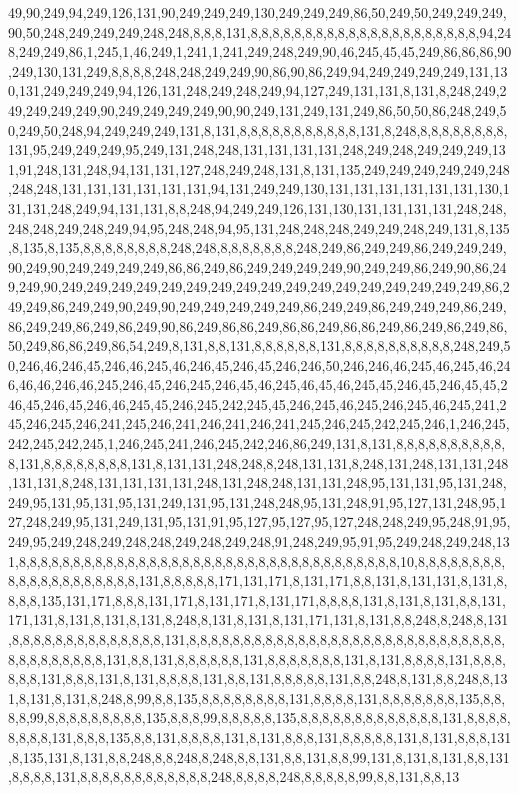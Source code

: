 49,90,249,94,249,126,131,90,249,249,249,130,249,249,249,86,50,249,50,249,249,249,90,50,248,249,249,249,248,248,8,8,8,131,8,8,8,8,8,8,8,8,8,8,8,8,8,8,8,8,8,8,8,8,8,94,248,249,249,86,1,245,1,46,249,1,241,1,241,249,248,249,90,46,245,45,45,249,86,86,86,90,249,130,131,249,8,8,8,8,248,248,249,249,90,86,90,86,249,94,249,249,249,249,131,130,131,249,249,249,94,126,131,248,249,248,249,94,127,249,131,131,8,131,8,248,249,249,249,249,249,90,249,249,249,249,90,90,249,131,249,131,249,86,50,50,86,248,249,50,249,50,248,94,249,249,249,131,8,131,8,8,8,8,8,8,8,8,8,8,8,131,8,248,8,8,8,8,8,8,8,8,131,95,249,249,249,95,249,131,248,248,131,131,131,131,248,249,248,249,249,249,131,91,248,131,248,94,131,131,127,248,249,248,131,8,131,135,249,249,249,249,249,248,248,248,131,131,131,131,131,131,94,131,249,249,130,131,131,131,131,131,131,130,131,131,248,249,94,131,131,8,8,248,94,249,249,126,131,130,131,131,131,131,248,248,248,248,249,248,249,94,95,248,248,94,95,131,248,248,248,249,249,248,249,131,8,135,8,135,8,135,8,8,8,8,8,8,8,8,248,248,8,8,8,8,8,8,8,248,249,86,249,249,86,249,249,249,90,249,90,249,249,249,249,86,86,249,86,249,249,249,249,90,249,249,86,249,90,86,249,249,90,249,249,249,249,249,249,249,249,249,249,249,249,249,249,249,249,249,86,249,249,86,249,249,90,249,90,249,249,249,249,249,86,249,249,86,249,249,249,86,249,86,249,249,86,249,86,249,90,86,249,86,86,249,86,86,249,86,86,249,86,249,86,249,86,50,249,86,86,249,86,54,249,8,131,8,8,131,8,8,8,8,8,8,131,8,8,8,8,8,8,8,8,8,8,248,249,50,246,46,246,45,246,46,245,46,246,45,246,45,246,246,50,246,246,46,245,46,245,46,246,46,46,246,46,245,246,45,246,245,246,45,46,245,46,45,46,245,45,246,45,246,45,45,246,45,246,45,246,46,245,45,246,245,242,245,45,246,245,46,245,246,245,46,245,241,245,246,245,246,241,245,246,241,246,241,246,241,245,246,245,242,245,246,1,246,245,242,245,242,245,1,246,245,241,246,245,242,246,86,249,131,8,131,8,8,8,8,8,8,8,8,8,8,8,131,8,8,8,8,8,8,8,8,131,8,131,131,248,248,8,248,131,131,8,248,131,248,131,131,248,131,131,8,248,131,131,131,131,248,131,248,248,131,131,248,95,131,131,95,131,248,249,95,131,95,131,95,131,249,131,95,131,248,248,95,131,248,91,95,127,131,248,95,127,248,249,95,131,249,131,95,131,91,95,127,95,127,95,127,248,248,249,95,248,91,95,249,95,249,248,249,248,248,249,248,249,248,91,248,249,95,91,95,249,248,249,248,131,8,8,8,8,8,8,8,8,8,8,8,8,8,8,8,8,8,8,8,8,8,8,8,8,8,8,8,8,8,8,8,8,8,8,8,10,8,8,8,8,8,8,8,8,8,8,8,8,8,8,8,8,8,8,8,8,131,8,8,8,8,8,171,131,171,8,131,171,8,8,131,8,131,131,8,131,8,8,8,8,135,131,171,8,8,8,131,171,8,131,171,8,131,171,8,8,8,8,131,8,131,8,131,8,8,131,171,131,8,131,8,131,8,131,8,248,8,131,8,131,8,131,171,131,8,131,8,8,248,8,248,8,131,8,8,8,8,8,8,8,8,8,8,8,8,8,8,131,8,8,8,8,8,8,8,8,8,8,8,8,8,8,8,8,8,8,8,8,8,8,8,8,8,8,8,8,8,8,8,8,8,8,8,8,8,8,131,8,8,131,8,8,8,8,8,8,131,8,8,8,8,8,8,8,131,8,131,8,8,8,8,131,8,8,8,8,8,8,131,8,8,8,131,8,131,8,8,8,8,131,8,8,131,8,8,8,8,8,131,8,8,248,8,131,8,8,248,8,131,8,131,8,131,8,248,8,99,8,8,135,8,8,8,8,8,8,8,8,131,8,8,8,8,131,8,8,8,8,8,8,8,135,8,8,8,8,99,8,8,8,8,8,8,8,8,8,135,8,8,8,99,8,8,8,8,8,135,8,8,8,8,8,8,8,8,8,8,8,8,8,131,8,8,8,8,8,8,8,8,131,8,8,8,135,8,8,131,8,8,8,8,131,8,131,8,8,8,131,8,8,8,8,8,131,8,131,8,8,8,131,8,135,131,8,131,8,8,248,8,8,248,8,248,8,8,131,8,8,131,8,8,99,131,8,131,8,131,8,8,131,8,8,8,8,131,8,8,8,8,8,8,8,8,8,8,8,8,248,8,8,8,8,248,8,8,8,8,8,99,8,8,131,8,8,13